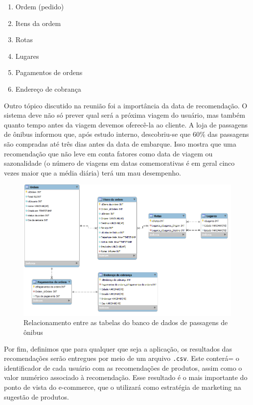 \begin{enumerate}
	\item Ordem (pedido)
	\item Itens da ordem
	\item Rotas
	\item Lugares
	\item Pagamentos de ordens
	\item Endereço de cobrança
\end{enumerate}

Outro tópico discutido na reunião foi a importância da data de recomendação. O sistema deve não só prever qual será a próxima viagem do usuário, mas também quanto tempo antes da viagem devemos oferecê-la ao cliente. A loja de passagens de ônibus informou que, após estudo interno, descobriu-se que 60\% das passagens são compradas até três dias antes da data de embarque. Isso mostra que uma recomendação que não leve em conta fatores como data de viagem ou sazonalidade (o número de viagens em datas comemorativas é em geral cinco vezes maior que a média diária) terá um mau desempenho.

\begin{center}
\begin{figure}[ht]
    \includegraphics[width=1\textwidth]{img/estrutura-banco-de-dados}
    \caption{Relacionamento entre as tabelas do banco de dados de passagens de ônibus}
    \label{fig:bd-clickbus}
\end{figure}
\end{center}

Por fim, definimos que para qualquer que seja a aplicação, os resultados das recomendações serão entregues por meio de um arquivo \texttt{.csv}. Este conterá= o identificador de cada usuário com as recomendações de produtos, assim como o valor numérico associado à recomendação. Esse resultado é o mais importante do ponto de vista do e-commerce, que o utilizará como estratégia de marketing na sugestão de produtos.